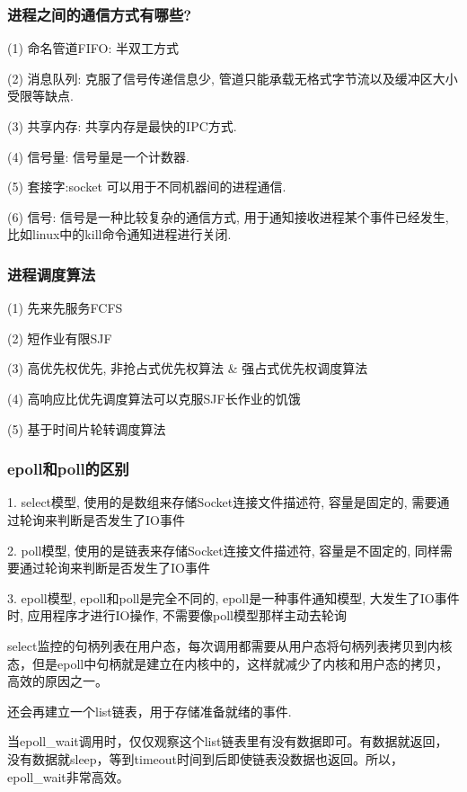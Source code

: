 \subsubsection{进程之间的通信方式有哪些?}
(1) 命名管道FIFO: 半双工方式 \par
(2) 消息队列: 克服了信号传递信息少, 管道只能承载无格式字节流以及缓冲区大小受限等缺点. \par
(3) 共享内存: 共享内存是最快的IPC方式. \par
(4) 信号量: 信号量是一个计数器. \par
(5) 套接字:socket 可以用于不同机器间的进程通信. \par
(6) 信号: 信号是一种比较复杂的通信方式, 用于通知接收进程某个事件已经发生, 比如linux中的kill命令通知进程进行关闭. \par
\subsubsection{进程调度算法}
(1) 先来先服务FCFS\par
(2) 短作业有限SJF \par
(3) 高优先权优先, 非抢占式优先权算法 \& 强占式优先权调度算法 \par
(4) 高响应比优先调度算法可以克服SJF长作业的饥饿 \par
(5) 基于时间片轮转调度算法 \par
\subsubsection{epoll和poll的区别}
1. select模型, 使用的是数组来存储Socket连接文件描述符, 容量是固定的, 需要通过轮询来判断是否发生了IO事件\par
2. poll模型, 使用的是链表来存储Socket连接文件描述符, 容量是不固定的, 同样需要通过轮询来判断是否发生了IO事件 \par
3. epoll模型, epoll和poll是完全不同的, epoll是一种事件通知模型, 大发生了IO事件时, 应用程序才进行IO操作, 不需要像poll模型那样主动去轮询 \par

select监控的句柄列表在用户态，每次调用都需要从用户态将句柄列表拷贝到内核态，但是epoll中句柄就是建立在内核中的，这样就减少了内核和用户态的拷贝，高效的原因之一。

还会再建立一个list链表，用于存储准备就绪的事件.

当epoll\_wait调用时，仅仅观察这个list链表里有没有数据即可。有数据就返回，没有数据就sleep，等到timeout时间到后即使链表没数据也返回。所以，epoll\_wait非常高效。
